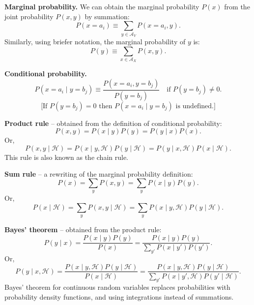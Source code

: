 \documentclass[11pt]{article}
\begin{document}
\par\medskip
\noindent \textbf{Marginal probability.} We can obtain the marginal probability $P(x)$ from the joint probability $P(x,y)$ by summation:
\begin{equation*}
  P(x=a_i) \equiv \sum_{y\in\mathcal{A}_Y} P(x=a_i,y).
\end{equation*}
Similarly, using briefer notation, the marginal probability of $y$ is:
\begin{equation*}
  P(y) \equiv \sum_{x\in\mathcal{A}_X} P(x,y).
\end{equation*}

\par\medskip
\noindent \textbf{Conditional probability.}
\begin{equation*}
  P(x=a_i \mid y=b_j) \equiv \frac{P(x=a_i,y=b_j)}{P(y=b_j)} \quad \text{if $P(y=b_j)\neq 0$.}
\end{equation*}
\[
  \text{[If $P(y=b_j)=0$ then $P(x=a_i \mid y=b_j)$ is undefined.]}
\]

\par\medskip
\noindent \textbf{Product rule} -- obtained from the definition of conditional probability:
\begin{equation*}
  P(x,y) = P(x\mid y)P(y)
  = P(y\mid x)P(x).
\end{equation*}
Or,
\begin{equation*}
  P(x,y\mid \mathcal{H}) = P(x\mid y,\mathcal{H})P(y\mid \mathcal{H})
  = P(y\mid x,\mathcal{H})P(x\mid \mathcal{H}).
\end{equation*}
This rule is also known as the chain rule.

\par\medskip
\noindent \textbf{Sum rule} -- a rewriting of the marginal probability definition:
\begin{equation*}
  P(x) = \sum_{y} P(x,y)
  = \sum_{y} P(x\mid y)P(y).
\end{equation*}
Or,
\begin{equation*}
  P(x\mid \mathcal{H}) = \sum_{y} P(x,y\mid \mathcal{H})
  = \sum_{y} P(x\mid y,\mathcal{H})P(y\mid \mathcal{H}).
\end{equation*}

\par\medskip
\noindent \textbf{Bayes' theorem} -- obtained from the product rule:
\begin{equation*}
  P(y\mid x) = \frac{P(x\mid y)P(y)}{P(x)}
  = \frac{P(x\mid y)P(y)}{\sum_{y'} P(x\mid y')P(y')}.
\end{equation*}
Or,
\begin{equation*}
  P(y\mid x,\mathcal{H}) = \frac{P(x\mid y,\mathcal{H})P(y\mid \mathcal{H})}{P(x\mid \mathcal{H})}
  = \frac{P(x\mid y,\mathcal{H})P(y\mid \mathcal{H})}{\sum_{y'} P(x\mid y',\mathcal{H})P(y'\mid \mathcal{H})}.
\end{equation*}
Bayes' theorem for continuous random variables replaces probabilities with probability density functions, and using integrations instead of summations.
\end{document}
